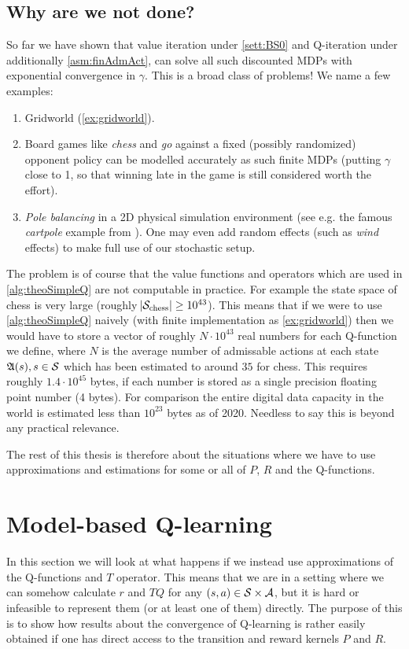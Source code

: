 \subsection{Why are we not done?}

So far we have shown that value iteration under \cref{sett:BS0}
and Q-iteration under additionally \cref{asm:finAdmAct}, can solve
all such discounted MDPs with exponential convergence in $\gamma$.
This is a broad class of problems!
We name a few examples:
\begin{enumerate}
  \item Gridworld (\cref{ex:gridworld}).
  \item Board games like \emph{chess} and \emph{go}
    against a fixed (possibly randomized) opponent policy
    can be modelled accurately
    as such finite MDPs (putting $\gamma$ close to 1, so that winning late in 
    the game is still considered worth the effort).
  \item \emph{Pole balancing} in a 2D physical simulation environment
    (see e.g. the famous \emph{cartpole} example from ).
    One may even add random effects (such as \emph{wind} effects)
    to make full use of our stochastic setup.
\end{enumerate}
The problem is of course that the value functions and operators
which are used in \cref{alg:theoSimpleQ} are not computable in practice.
For example the state space of chess is very large
(roughly $\abs{\mathcal{S}_{\mathrm{chess}}} \geq 10^{43}$).
This means that if we were to use \cref{alg:theoSimpleQ} naively
(with finite implementation as \cref{ex:gridworld})
then we would have to store a vector of
roughly $N \cdot 10^{43}$ real numbers for each Q-function we define,
where $N$ is the average number of admissable actions at each state
$\frak{A}(s), s \in \mathcal{S}$
which has been estimated to around $35$ for chess.
This requires roughly $1.4 \cdot 10^{45}$ bytes, if each number is stored as a
single precision floating point number (4 bytes).
For comparison the entire digital data capacity in the world is estimated
less than $10^{23}$ bytes as of 2020.
Needless to say this is beyond any practical relevance.

The rest of this thesis is therefore about the situations where we have
to use approximations and estimations for some or all of $P$, $R$ and
the Q-functions.

\section{Model-based Q-learning}
In this section we will look at what happens if we
instead use approximations of the Q-functions and $T$ operator.
This means that we are in a setting where we can somehow
calculate $r$ and $TQ$ for any $(s,a) \in \mathcal{S} \times \mathcal{A}$,
but it is hard or infeasible to represent them (or at least one of them)
directly.
The purpose of this is to show how results about the convergence of Q-learning
is rather easily obtained if one has direct access
to the transition and reward kernels $P$ and $R$.


